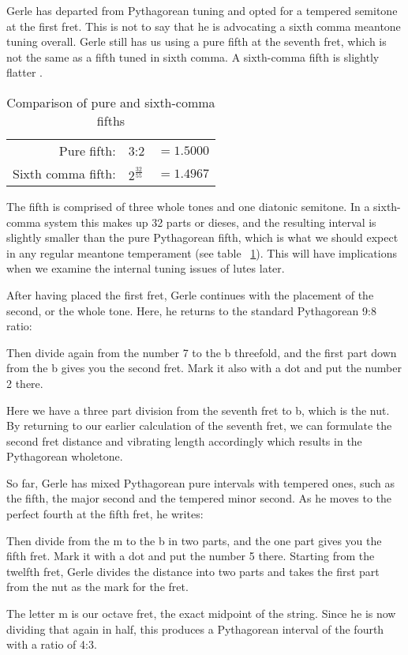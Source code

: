 Gerle has
departed from Pythagorean tuning and opted for a tempered semitone at the first
fret.  This is not to say that he is advocating a sixth comma meantone
tuning overall.  Gerle still has us using a pure fifth at the seventh fret,
which is not the same as a fifth tuned in sixth comma.  A sixth-comma fifth is
slightly flatter .
\begin{table}[h!]
    \begin{center}
    \begin{tabular}{ r l l }
        Pure fifth:        & 3:2                 & $ = 1.5000 $ \\
        Sixth comma fifth: & $ 2^\frac{32}{55} $ & $ = 1.4967 $ \\
    \end{tabular}
    \end{center}
    \caption{Comparison of pure and sixth-comma fifths}
    \label{table:6fifths}
\end{table}
The fifth is comprised of three whole tones and one diatonic semitone.
In a sixth-comma
system this makes up 32 parts or dieses, and the resulting interval is slightly smaller than the pure
Pythagorean fifth, which is what we should expect in any regular meantone temperament
(see table ~\ref{table:6fifths}). This will have implications when we
examine the internal tuning issues of lutes later.

After having placed the first fret, Gerle continues with the placement of the second, or the whole tone.
Here, he returns to the standard Pythagorean 9:8 ratio:
\begin{blocks}
Then divide again from the number 7 to the b threefold, and the first part down
from the b gives you the second fret.  Mark it also with a dot and put the
number 2 there.
\end{blocks}
Here we have a three part division from the seventh fret to b, which is the nut.
By returning to our earlier calculation of the seventh fret, we can formulate the
second fret distance and vibrating length accordingly which results in the Pythagorean
wholetone.

So far, Gerle has mixed Pythagorean pure intervals with tempered ones, such as
the fifth, the major second and the tempered minor second.  As he moves to the
perfect fourth at the fifth fret, he writes:
\begin{blocks}
Then divide from the m to the b in two parts, and the one part gives you the
fifth fret. Mark it with a dot and put the number 5 there. Starting from the
twelfth fret, Gerle divides the distance into two parts and takes the first part
from the nut as the mark for the fret.
\end{blocks}
The letter m is our octave fret, the exact midpoint of the string. Since
he is now dividing that again in half, this produces a
Pythagorean interval of the fourth with a ratio of 4:3.

